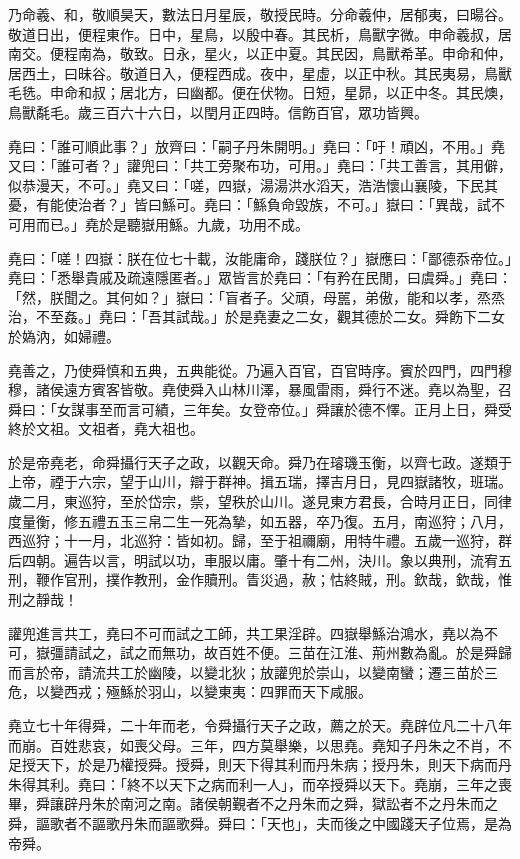 \begin{pinyinscope}
乃命羲、和，敬順昊天，數法日月星辰，敬授民時。分命羲仲，居郁夷，曰暘谷。敬道日出，便程東作。日中，星鳥，以殷中春。其民析，鳥獸字微。申命羲叔，居南交。便程南為，敬致。日永，星火，以正中夏。其民因，鳥獸希革。申命和仲，居西土，曰昧谷。敬道日入，便程西成。夜中，星虛，以正中秋。其民夷易，鳥獸毛毨。申命和叔；居北方，曰幽都。便在伏物。日短，星昴，以正中冬。其民燠，鳥獸氄毛。歲三百六十六日，以閏月正四時。信飭百官，眾功皆興。

堯曰：「誰可順此事？」放齊曰：「嗣子丹朱開明。」堯曰：「吁！頑凶，不用。」堯又曰：「誰可者？」讙兜曰：「共工旁聚布功，可用。」堯曰：「共工善言，其用僻，似恭漫天，不可。」堯又曰：「嗟，四嶽，湯湯洪水滔天，浩浩懷山襄陵，下民其憂，有能使治者？」皆曰鯀可。堯曰：「鯀負命毀族，不可。」嶽曰：「異哉，試不可用而已。」堯於是聽嶽用鯀。九歲，功用不成。

堯曰：「嗟！四嶽：朕在位七十載，汝能庸命，踐朕位？」嶽應曰：「鄙德忝帝位。」堯曰：「悉舉貴戚及疏遠隱匿者。」眾皆言於堯曰：「有矜在民閒，曰虞舜。」堯曰：「然，朕聞之。其何如？」嶽曰：「盲者子。父頑，母嚚，弟傲，能和以孝，烝烝治，不至姦。」堯曰：「吾其試哉。」於是堯妻之二女，觀其德於二女。舜飭下二女於媯汭，如婦禮。

堯善之，乃使舜慎和五典，五典能從。乃遍入百官，百官時序。賓於四門，四門穆穆，諸侯遠方賓客皆敬。堯使舜入山林川澤，暴風雷雨，舜行不迷。堯以為聖，召舜曰：「女謀事至而言可績，三年矣。女登帝位。」舜讓於德不懌。正月上日，舜受終於文祖。文祖者，堯大祖也。

於是帝堯老，命舜攝行天子之政，以觀天命。舜乃在璿璣玉衡，以齊七政。遂類于上帝，禋于六宗，望于山川，辯于群神。揖五瑞，擇吉月日，見四嶽諸牧，班瑞。歲二月，東巡狩，至於岱宗，祡，望秩於山川。遂見東方君長，合時月正日，同律度量衡，修五禮五玉三帛二生一死為摯，如五器，卒乃復。五月，南巡狩；八月，西巡狩；十一月，北巡狩：皆如初。歸，至于祖禰廟，用特牛禮。五歲一巡狩，群后四朝。遍告以言，明試以功，車服以庸。肇十有二州，決川。象以典刑，流宥五刑，鞭作官刑，撲作教刑，金作贖刑。眚災過，赦；怙終賊，刑。欽哉，欽哉，惟刑之靜哉！

讙兜進言共工，堯曰不可而試之工師，共工果淫辟。四嶽舉鯀治鴻水，堯以為不可，嶽彊請試之，試之而無功，故百姓不便。三苗在江淮、荊州數為亂。於是舜歸而言於帝，請流共工於幽陵，以變北狄；放讙兜於崇山，以變南蠻；遷三苗於三危，以變西戎；殛鯀於羽山，以變東夷：四罪而天下咸服。

堯立七十年得舜，二十年而老，令舜攝行天子之政，薦之於天。堯辟位凡二十八年而崩。百姓悲哀，如喪父母。三年，四方莫舉樂，以思堯。堯知子丹朱之不肖，不足授天下，於是乃權授舜。授舜，則天下得其利而丹朱病；授丹朱，則天下病而丹朱得其利。堯曰：「終不以天下之病而利一人」，而卒授舜以天下。堯崩，三年之喪畢，舜讓辟丹朱於南河之南。諸侯朝覲者不之丹朱而之舜，獄訟者不之丹朱而之舜，謳歌者不謳歌丹朱而謳歌舜。舜曰：「天也」，夫而後之中國踐天子位焉，是為帝舜。


\end{pinyinscope}
